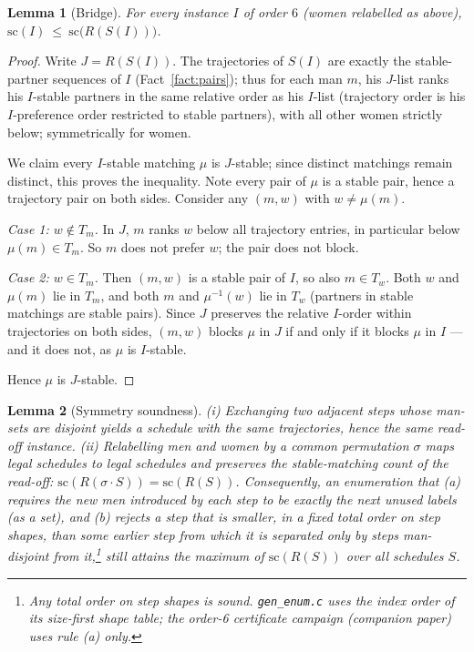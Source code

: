\documentclass[11pt]{article}
\newtheorem{lemma}{Lemma}
\begin{document}
\begin{lemma}[Bridge]\label{lem:bridge}
For every instance $I$ of order $6$ (women relabelled as above),
$\mathrm{sc}(I)\ \le\ \mathrm{sc}\bigl(R(S(I))\bigr)$.
\end{lemma}

\begin{proof}
Write $J=R(S(I))$. The trajectories of $S(I)$ are exactly the stable-partner sequences
of $I$ (Fact~\ref{fact:pairs}); thus for each man $m$, his $J$-list ranks his $I$-stable
partners in the same relative order as his $I$-list (trajectory order is his
$I$-preference order restricted to stable partners), with all other women strictly
below; symmetrically for women.

We claim every $I$-stable matching $\mu$ is $J$-stable; since distinct matchings remain
distinct, this proves the inequality. Note every pair of $\mu$ is a stable pair, hence
a trajectory pair on both sides. Consider any $(m,w)$ with $w\ne\mu(m)$.

\emph{Case 1: $w\notin T_m$.} In $J$, $m$ ranks $w$ below all trajectory entries, in
particular below $\mu(m)\in T_m$. So $m$ does not prefer $w$; the pair does not block.

\emph{Case 2: $w\in T_m$.} Then $(m,w)$ is a stable pair of $I$, so also $m\in T_w$.
Both $w$ and $\mu(m)$ lie in $T_m$, and both $m$ and $\mu^{-1}(w)$ lie in $T_w$
(partners in stable matchings are stable pairs). Since $J$ preserves the relative
$I$-order within trajectories on both sides, $(m,w)$ blocks $\mu$ in $J$ if and only
if it blocks $\mu$ in $I$ --- and it does not, as $\mu$ is $I$-stable.

Hence $\mu$ is $J$-stable.
\end{proof}

\begin{lemma}[Symmetry soundness]\label{lem:sym}
(i) Exchanging two adjacent steps whose man-sets are disjoint yields a schedule with
the same trajectories, hence the same read-off instance.
(ii) Relabelling men and women by a common permutation $\sigma$ maps legal schedules to
legal schedules and preserves the stable-matching count of the read-off:
$\mathrm{sc}(R(\sigma\cdot S))=\mathrm{sc}(R(S))$.
Consequently, an enumeration that (a) requires the new men introduced by each step to
be exactly the next unused labels (as a set), and (b) rejects a step that is smaller, in
a fixed total order on step shapes, than some earlier step from which it is separated
only by steps man-disjoint from it,\footnote{Any total order on step shapes is sound.
\texttt{gen\_enum.c} uses the index order of its size-first shape table; the order-6
certificate campaign (companion paper) uses rule (a) only.} still attains the maximum of
$\mathrm{sc}(R(S))$ over all schedules $S$.
\end{lemma}
\end{document}
